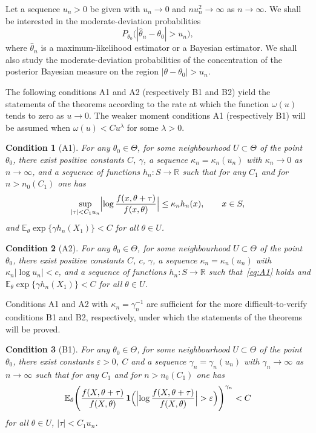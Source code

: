 \documentclass[11pt,a4paper]{article}
\newtheorem{condition}{Condition}
\begin{document}
Let a sequence $u_n>0$ be given with $u_n\to 0$ and $nu_n^2\to\infty$ as $n\to\infty$. We shall be interested in the moderate-deviation probabilities
\[
P_{\theta_0}\bigl(|\hat\theta_n-\theta_0|>u_n\bigr),
\]
where $\hat\theta_n$ is a maximum-likelihood estimator or a Bayesian estimator. We shall also study the moderate-deviation probabilities of the concentration of the posterior Bayesian measure on the region $|\theta-\theta_0|>u_n$.

The following conditions A1 and A2 (respectively B1 and B2) yield the statements of the theorems according to the rate at which the function $\omega(u)$ tends to zero as $u\to 0$. The weaker moment conditions A1 (respectively B1) will be assumed when $\omega(u)<Cu^\lambda$ for some $\lambda>0$.

\begin{condition}[A1]
For any $\theta_0\in\Theta$, for some neighbourhood $U\subset\Theta$ of the point $\theta_0$, there exist positive constants $C$, $\gamma$, a sequence $\kappa_n=\kappa_n(u_n)$ with $\kappa_n\to 0$ as $n\to\infty$, and a sequence of functions $h_n:S\to\mathbb{R}$ such that for any $C_1$ and for $n>n_0(C_1)$ one has
\begin{equation}
\sup_{|\tau|<C_1u_n}\Bigl|\log\frac{f(x,\theta+\tau)}{f(x,\theta)}\Bigr|\le\kappa_nh_n(x),\qquad x\in S,
\label{eq:A1}
\end{equation}
and $\mathbb{E}_\theta\exp\{\gamma h_n(X_1)\}<C$ for all $\theta\in U$.
\end{condition}

\begin{condition}[A2]
For any $\theta_0\in\Theta$, for some neighbourhood $U\subset\Theta$ of the point $\theta_0$, there exist positive constants $C$, $c$, $\gamma$, a sequence $\kappa_n=\kappa_n(u_n)$ with $\kappa_n|\log u_n|<c$, and a sequence of functions $h_n:S\to\mathbb{R}$ such that~\eqref{eq:A1} holds and $\mathbb{E}_\theta\exp\{\gamma h_n(X_1)\}<C$ for all $\theta\in U$.
\end{condition}

Conditions A1 and A2 with $\kappa_n=\gamma_n^{-1}$ are sufficient for the more difficult-to-verify conditions B1 and B2, respectively, under which the statements of the theorems will be proved.

\begin{condition}[B1]
For any $\theta_0\in\Theta$, for some neighbourhood $U\subset\Theta$ of the point $\theta_0$, there exist constants $\varepsilon>0$, $C$ and a sequence $\gamma_n=\gamma_n(u_n)$ with $\gamma_n\to\infty$ as $n\to\infty$ such that for any $C_1$ and for $n>n_0(C_1)$ one has
\begin{equation}
\mathbb{E}_\theta\Biggl(\frac{f(X,\theta+\tau)}{f(X,\theta)}\,\mathbf{1}\Bigl(\Bigl|\log\frac{f(X,\theta+\tau)}{f(X,\theta)}\Bigr|>\varepsilon\Bigr)\Biggr)^{\gamma_n}<C
\label{eq:B1}
\end{equation}
for all $\theta\in U$, $|\tau|<C_1u_n$.
\end{condition}
\end{document}
